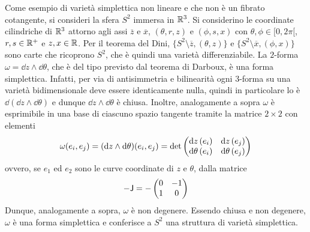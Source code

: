 Come esempio di varietà simplettica non lineare e che non è un fibrato cotangente, si consideri la sfera $S^2$ immersa in $\mathbb{R}^3$. Si considerino le coordinate cilindriche di $\mathbb{R}^3$ attorno agli assi $\overline{z}$ e $\overline{x}$, $(\theta,r,z)$ e $(\phi, s, x)$ con $\theta,\phi \in [0,2\pi[$, $r,s \in \mathbb{R}^+$ e $z,x \in \mathbb{R}$. Per il teorema del Dini, $\big\lbrace S^2 \setminus \overline{z}, (\theta,z)\big\rbrace$ e $\big\lbrace S^2 \setminus \overline{x}, (\phi,x)\big\rbrace$ sono carte che ricoprono $S^2$, che è quindi una varietà differenziabile. La $2$-forma $\omega = \dd{z} \wedge \dd{\theta}$, che è del tipo previsto dal teorema di Darboux, è una forma simplettica. Infatti, per via di antisimmetria e bilinearità ogni $3$-forma su una varietà bidimensionale deve essere identicamente nulla, quindi in particolare lo è $\dd (\dd z \wedge \dd \theta)$ e dunque $\dd z \wedge \dd \theta$ è chiusa. Inoltre, analogamente a sopra $\omega$ è esprimibile in una base di ciascuno spazio tangente tramite la matrice $2\times 2$ con elementi 
\begin{equation*}
\omega(e_i,e_j) = (\dd{z} \wedge \dd{\theta}) (e_i, e_j) = \det\pmqty{\dd{z}(e_i) & \dd{z}(e_j) \\ \dd{\theta}(e_i) & \dd{\theta}(e_j)}
\end{equation*} 
ovvero, se $e_1$ ed $e_2$ sono le curve coordinate di $z$ e $\theta$, dalla matrice
\begin{equation*}
  - \mathsf{J} = - \pmqty{0 & -1 \\ 1 & 0}
\end{equation*}
Dunque, analogamente a sopra, $\omega$ è non degenere. Essendo chiusa e non degenere, $\omega$ è una forma simplettica e conferisce a $S^2$ una struttura di varietà simplettica.

